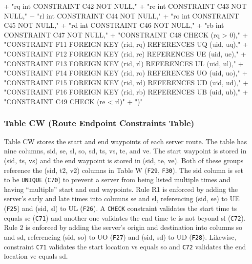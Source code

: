 \documentclass{article}
\def\nwendcode{\endtrivlist \endgroup}      %
\let\nwdocspar=\par
\theoremstyle{definition}                   %
\begin{document}
  + "rq  int  CONSTRAINT C42 NOT NULL,"
  + "re  int  CONSTRAINT C43 NOT NULL,"
  + "rl  int  CONSTRAINT C44 NOT NULL,"
  + "ro  int  CONSTRAINT C45 NOT NULL,"
  + "rd  int  CONSTRAINT C46 NOT NULL,"
  + "rb  int  CONSTRAINT C47 NOT NULL,"
  + "CONSTRAINT C48 CHECK (rq > 0),"
  + "CONSTRAINT F11 FOREIGN KEY (rid, rq) REFERENCES UQ (uid, uq),"
  + "CONSTRAINT F12 FOREIGN KEY (rid, re) REFERENCES UE (uid, ue),"
  + "CONSTRAINT F13 FOREIGN KEY (rid, rl) REFERENCES UL (uid, ul),"
  + "CONSTRAINT F14 FOREIGN KEY (rid, ro) REFERENCES UO (uid, uo),"
  + "CONSTRAINT F15 FOREIGN KEY (rid, rd) REFERENCES UD (uid, ud),"
  + "CONSTRAINT F16 FOREIGN KEY (rid, rb) REFERENCES UB (uid, ub),"
  + "CONSTRAINT C49 CHECK (re < rl)"
  + ")"
\nwendcode{}\nwdocspar

\subsubsection{Table CW (Route Endpoint Constraints Table)}
Table CW stores the start and end waypoints of each server route.  The table
has nine columns, \textsf{sid}, \textsf{se}, \textsf{sl}, \textsf{so},
\textsf{sd}, \textsf{ts}, \textsf{vs}, \textsf{te}, and \textsf{ve}.  The start
waypoint is stored in (\textsf{sid}, \textsf{ts}, \textsf{vs}) and the end
waypoint is stored in (\textsf{sid}, \textsf{te}, \textsf{ve}). Both of these
groups reference the (\textsf{sid}, \textsf{t2}, \textsf{v2}) columns in Table
W ({\tt{}F29}, {\tt{}F30}).  The \textsf{sid} column is set to be \texttt{UNIQUE}
({\tt{}C70}) to prevent a server from being listed multiple times and having
``multiple'' start and end waypoints.  Rule R1 is enforced by adding the
server's early and late times into columns \textsf{se} and \textsf{sl},
referencing (\textsf{sid}, \textsf{se}) to UE ({\tt{}F25}) and (\textsf{sid},
\textsf{sl}) to UL ({\tt{}F26}).  A \texttt{CHECK} constraint validates the start
time \textsf{ts} equals \textsf{se} ({\tt{}C71}) and another one validates the end
time \textsf{te} is not beyond \textsf{sl} ({\tt{}C72}).  Rule 2 is enforced by
adding the server's origin and destination into columns \textsf{so} and
\textsf{sd}, referencing (\textsf{sid}, \textsf{so}) to UO ({\tt{}F27}) and
(\textsf{sid}, \textsf{sd}) to UD ({\tt{}F28}).  Likewise, constraint {\tt{}C71}
validates the start location \textsf{vs} equals \textsf{so} and {\tt{}C72}
validates the end location \textsf{ve} equals \textsf{sd}.
\end{document}
